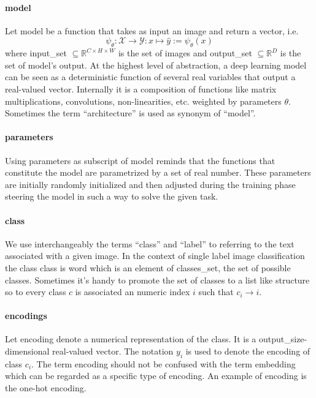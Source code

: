 \paragraph{model} Let \gls{model} be a function that takes as input an image
and return a vector, i.e.\
\begin{equation}
  \psi_\theta: \mathcal{X} \to \mathcal{Y}
     : x \mapsto \hat{y} := \psi_\theta \left(x\right)
  \label{eq:model}
\end{equation}
where \gls{input_set} $\subseteq \mathbb{R}^{C \times H \times W}$ is the set of
images and \gls{output_set} $\subseteq \mathbb{R}^{D}$ is the set of model's
output. At the highest level of abstraction, a deep learning model can be seen as
a deterministic function of several real variables that output a real-valued
vector. Internally it is a composition of functions like matrix multiplications,
convolutions, non-linearities, etc. weighted by parameters $\theta$. Sometimes
the term ``architecture'' is used as synonym of ``model''.

\paragraph{parameters} Using \gls{parameters} as subscript of \gls{model}
reminds that the functions that constitute the model are parametrized by a set
of real number. These parameters are initially randomly initialized and then
adjusted during the training phase steering the model in such a way to solve
the given task.

\paragraph{class} We use interchangeably the terms ``class'' and ``label'' to
referring to the text associated with a given image. In the context of single
label image classification the class \gls{class} is word which is an element of
\gls{classes_set}, the set of possible classes. Sometimes it's handy to promote
the set of classes to a list like structure so to every class $c$ is associated
an numeric index $i$ such that $c_i \to i$.

\paragraph{encodings} Let \gls{encoding} denote a numerical representation of
the class. It is a \gls{output_size}-dimensional real-valued vector. The
notation $y_i$ is used to denote the encoding of class $c_i$. The term encoding
should not be confused with the term embedding which can be regarded as a
specific type of encoding. An example of encoding is the one-hot encoding.

